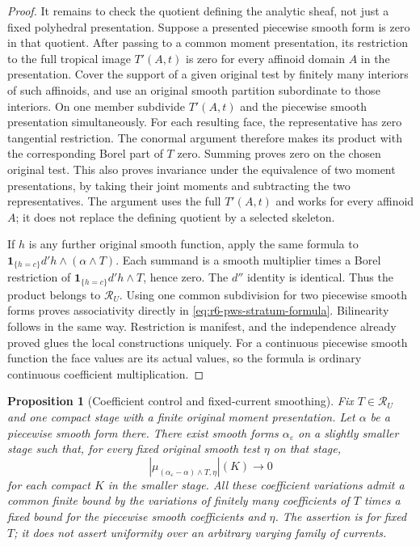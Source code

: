 \documentclass[11pt,a4paper]{article}
\numberwithin{equation}{section}
\newtheorem{proposition}[theorem]{Proposition}
\theoremstyle{definition}
\theoremstyle{remark}
\begin{document}
\begin{proof}
It remains to check the quotient defining the analytic
sheaf, not just a fixed polyhedral presentation. Suppose
a presented piecewise smooth form is zero in that quotient.
After passing to a common moment presentation, its
restriction to the full tropical image $T'(A,t)$ is zero
for every affinoid domain $A$ in the presentation. Cover
the support of a given original test by finitely many
interiors of such affinoids, and use an original smooth
partition subordinate to those interiors. On one member
subdivide $T'(A,t)$ and the piecewise smooth presentation
simultaneously. For each resulting face, the representative
has zero tangential restriction. The conormal argument
therefore makes its product with the corresponding Borel
part of $T$ zero. Summing proves zero on the chosen original
test. This also proves invariance under the equivalence
of two moment presentations, by taking their joint moments
and subtracting the two representatives. The argument uses
the full $T'(A,t)$ and works for every affinoid $A$; it does
not replace the defining quotient by a selected skeleton.

If $h$ is any further original smooth function, apply the
same formula to $\mathbf1_{\{h=c\}}d'h\wedge(\alpha\wedge T)$.
Each summand is a smooth multiplier times a Borel restriction
of $\mathbf1_{\{h=c\}}d'h\wedge T$, hence zero. The $d''$
identity is identical. Thus the product belongs to
$\mathscr R_U$. Using one common subdivision for two
piecewise smooth forms proves associativity directly in
\eqref{eq:r6-pws-stratum-formula}. Bilinearity follows in the
same way. Restriction is manifest, and the independence
already proved glues the local constructions uniquely.
For a continuous piecewise smooth function the face values
are its actual values, so the formula is ordinary continuous
coefficient multiplication.
\end{proof}

\begin{proposition}[Coefficient control and fixed-current smoothing]
\label{prop:r6-pws-smoothing}
Fix $T\in\mathscr R_U$ and one compact stage with a finite
original moment presentation. Let $\alpha$ be a piecewise
smooth form there. There exist smooth forms $\alpha_\varepsilon$
on a slightly smaller stage such that, for every fixed
original smooth test $\eta$ on that stage,
\[
 \left|\mu_{(\alpha_\varepsilon-\alpha)\wedge T,\eta}\right|(K)
                         \longrightarrow0
\]
for each compact $K$ in the smaller stage. All these
coefficient variations admit a common finite bound by the
variations of finitely many coefficients of $T$ times a
fixed bound for the piecewise smooth coefficients and $\eta$.
The assertion is for fixed $T$; it does not assert uniformity
over an arbitrary varying family of currents.
\end{proposition}
\end{document}
